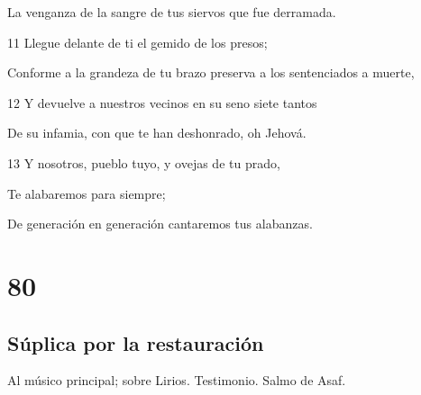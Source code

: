 \par La venganza de la sangre de tus siervos que fue derramada.
\par 11 Llegue delante de ti el gemido de los presos;
\par Conforme a la grandeza de tu brazo preserva a los sentenciados a muerte,
\par 12 Y devuelve a nuestros vecinos en su seno siete tantos
\par De su infamia, con que te han deshonrado, oh Jehová.
\par 13 Y nosotros, pueblo tuyo, y ovejas de tu prado,
\par Te alabaremos para siempre;
\par De generación en generación cantaremos tus alabanzas.

\chapter{80}

\section*{Súplica por la restauración}

\par Al músico principal; sobre Lirios. Testimonio. Salmo de Asaf.

